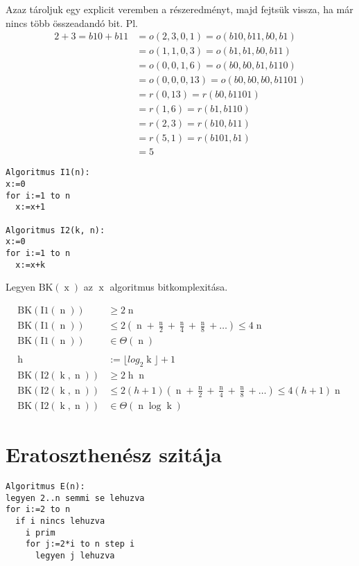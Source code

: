 \documentclass[a4paper]{article}
\newcommand*{\fBC}[1]{\ensuremath{\operatorname{BK\left(#1\right)}}}
\newcommand*{\vH}{\ensuremath{\operatorname{h}}}
\newcommand*{\vK}{\ensuremath{\operatorname{k}}}
\newcommand*{\vN}{\ensuremath{\operatorname{n}}}
\newcommand*{\vX}{\ensuremath{\operatorname{x}}}
\begin{document}
Azaz tároljuk egy explicit veremben a részeredményt,
majd fejtsük vissza, ha már nincs több összeadandó bit. Pl.
\begin{align*}
2+3 = b10+b11 &= o(2, 3, 0, 1) = o(b10, b11, b0, b1) \\
	&= o(1, 1, 0, 3) = o(b1, b1, b0, b11) \\
	&= o(0, 0, 1, 6) = o(b0, b0, b1, b110) \\
	&= o(0, 0, 0, 13) = o(b0, b0, b0, b1101) \\
	&= r(0, 13) = r(b0, b1101) \\
	&= r(1, 6) = r(b1, b110) \\
	&= r(2, 3) = r(b10, b11) \\
	&= r(5, 1) = r(b101, b1) \\
	&= 5
\end{align*}

\begin{lstlisting}
Algoritmus I1(n):
x:=0
for i:=1 to n
  x:=x+1

Algoritmus I2(k, n):
x:=0
for i:=1 to n
  x:=x+k
\end{lstlisting}

Legyen $\fBC{\vX}$ az $\vX$ algoritmus bitkomplexitása.

\begin{align*}
\fBC{I1(\vN)} &\geq 2 \vN \\
\fBC{I1(\vN)}
	&\leq 2 \left( \vN + \frac{\vN}{2} + \frac{\vN}{4} + \frac{\vN}{8} + \ldots \right)
	\leq 4 \vN \\
\fBC{I1(\vN)} & \in \Theta(\vN) \\
\\
\vH & := \lfloor log_{2}{\vK} \rfloor + 1 \\
\fBC{I2(\vK, \vN)} &\geq 2 \vH \vN \\
\fBC{I2(\vK, \vN)}
	&\leq 2 ( h + 1 ) \left( \vN + \frac{\vN}{2} + \frac{\vN}{4} + \frac{\vN}{8} + \ldots \right)
	\leq 4 ( h + 1 ) \vN \\
\fBC{I2(\vK, \vN)} & \in \Theta(\vN \log{\vK})
\end{align*}

\section{Eratoszthenész szitája}
\begin{lstlisting}
Algoritmus E(n):
legyen 2..n semmi se lehuzva
for i:=2 to n
  if i nincs lehuzva
    i prim
    for j:=2*i to n step i
      legyen j lehuzva

\end{lstlisting}
\end{document}
